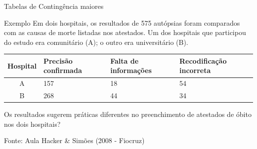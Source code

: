 \documentclass{beamer}
\begin{document}




\begin{frame}{Tabelas de Contingência maiores}
  \begin{exampleblock}{Exemplo}
    Em dois hospitais, os resultados de 575 autópsias
    foram comparados com as causas de morte listadas nos
    atestados. Um dos hospitais que participou do estudo era
    comunitário (A); o outro era universitário (B).

    \begin{tabular}{c|p{2cm}|p{2cm}|p{2cm}}
      Hospital & Precisão confirmada & Falta de informações &
      Recodificação incorreta \\
      \hline
      A & 157 & 18 & 54 \\
      \hline
      B & 268 & 44 & 34 \\
    \end{tabular}

    Os resultados sugerem práticas diferentes no preenchimento de
    atestados de óbito nos dois hospitais?
  \end{exampleblock}
  Fonte: Aula Hacker \& Simões (2008 - Fiocruz)
\end{frame}
\end{document}
